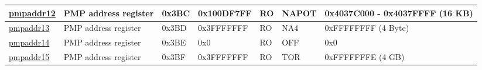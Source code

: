 \begin{longtable}[c]{ | l | l | l | l | l| L{1.8cm}| L{2.23cm}| }
\hyperref[sec:riscvcpu-pmp-reg-desc]{pmpaddr12} & PMP address register & 0x3BC & 0x100DF7FF & RO & NAPOT & 0x4037C000 - 0x4037FFFF (16 KB)\\\hline
\hyperref[sec:riscvcpu-pmp-reg-desc]{pmpaddr13} & PMP address register & 0x3BD & 0x3FFFFFFF & RO & NA4 & 0xFFFFFFFF (4 Byte)\\\hline
\hyperref[sec:riscvcpu-pmp-reg-desc]{pmpaddr14} & PMP address register & 0x3BE & 0x0 & RO & OFF & 0x0 \\\hline
\hyperref[sec:riscvcpu-pmp-reg-desc]{pmpaddr15} & PMP address register & 0x3BF & 0x3FFFFFFF & RO & TOR & 0xFFFFFFFE (4 GB)\\\hline

\end{longtable}
